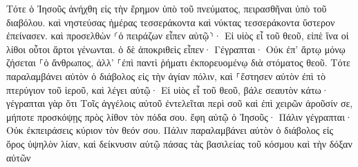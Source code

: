 \documentclass{openreader}
\begin{document}
Τότε ὁ Ἰησοῦς ἀνήχθη εἰς τὴν ἔρημον ὑπὸ τοῦ πνεύματος, πειρασθῆναι ὑπὸ τοῦ διαβόλου. 
καὶ νηστεύσας ἡμέρας τεσσεράκοντα καὶ νύκτας τεσσεράκοντα ὕστερον ἐπείνασεν. 
καὶ προσελθὼν ⸂ὁ πειράζων εἶπεν αὐτῷ⸃· Εἰ υἱὸς εἶ τοῦ θεοῦ, εἰπὲ ἵνα οἱ λίθοι οὗτοι ἄρτοι γένωνται. 
ὁ δὲ ἀποκριθεὶς εἶπεν· Γέγραπται· Οὐκ ἐπ’ ἄρτῳ μόνῳ ζήσεται ⸀ὁ ἄνθρωπος, ἀλλ’ ⸀ἐπὶ παντὶ ῥήματι ἐκπορευομένῳ διὰ στόματος θεοῦ. 
Τότε παραλαμβάνει αὐτὸν ὁ διάβολος εἰς τὴν ἁγίαν πόλιν, καὶ ⸀ἔστησεν αὐτὸν ἐπὶ τὸ πτερύγιον τοῦ ἱεροῦ, 
καὶ λέγει αὐτῷ· Εἰ υἱὸς εἶ τοῦ θεοῦ, βάλε σεαυτὸν κάτω· γέγραπται γὰρ ὅτι Τοῖς ἀγγέλοις αὐτοῦ ἐντελεῖται περὶ σοῦ καὶ ἐπὶ χειρῶν ἀροῦσίν σε, μήποτε προσκόψῃς πρὸς λίθον τὸν πόδα σου. 
ἔφη αὐτῷ ὁ Ἰησοῦς· Πάλιν γέγραπται· Οὐκ ἐκπειράσεις κύριον τὸν θεόν σου. 
Πάλιν παραλαμβάνει αὐτὸν ὁ διάβολος εἰς ὄρος ὑψηλὸν λίαν, καὶ δείκνυσιν αὐτῷ πάσας τὰς βασιλείας τοῦ κόσμου καὶ τὴν δόξαν αὐτῶν 
\end{document}
